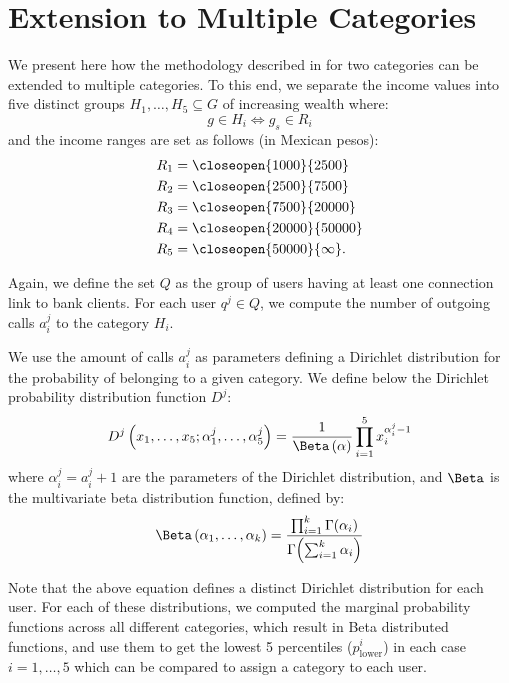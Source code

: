 \chapter{Extension to Multiple Categories}

We present here how the methodology described in  for
two categories can be extended to multiple categories.
To this end, we separate the income values into five distinct groups \( H_1, \ldots, H_5 \subseteq G \) of increasing wealth where:
\[
	g \in H_i \iff g_s \in R_i
\]
and the income ranges are set as follows (in Mexican pesos):
\begin{align*}
	R_1 &= \closeopen{1000}{2500} \\
	R_2 &= \closeopen{2500}{7500} \\
	R_3 &= \closeopen{7500}{20000} \\
	R_4 &= \closeopen{20000}{50000} \\
	R_5 &= \closeopen{50000}{\infty}. \\
\end{align*}

Again, we define the set \( Q \) as the group of users having at least one connection link to bank clients. For each user \( q^j \in Q \), we compute the number of outgoing calls \( a^j_i \) to the category \( H_i \).

We use the amount of calls \( a^j_i \) as parameters defining a Dirichlet distribution for the probability of belonging to a given category.
We define below the Dirichlet probability distribution function \( D^j \):
\begin{equation}
D^j \left( x_1, \ldots, x_5; \alpha^j_1, \ldots, \alpha^j_5 \right) = \frac{1}{\Beta \left( \alpha \right)} \prod^5_{i = 1} x_i^{\alpha^j_i - 1}
\label{Dirichlet}
\end{equation}
where \( \alpha^j_i = a^j_i +1 \) are the parameters of the Dirichlet distribution, and \( \Beta \) is the multivariate beta distribution function, defined by: %
\begin{equation}
\Beta \left( \alpha_1, \ldots, \alpha_k \right) = \frac{\prod^k_{i = 1} \Gamma \! \left( \alpha_i \right)}{\Gamma \! \left( \sum^k_{i = 1} \alpha_i \right) }
\label{Beta}
\end{equation}

Note that the above equation defines a distinct Dirichlet distribution for each user. For each of these distributions, we computed the marginal probability functions across all different categories, which result in Beta distributed functions, and use them to get the lowest 5 percentiles (\(p^i_{\operatorname{lower}}\)) in each case \( {i=1, \ldots, 5} \) which can be compared to assign a category to each user.

